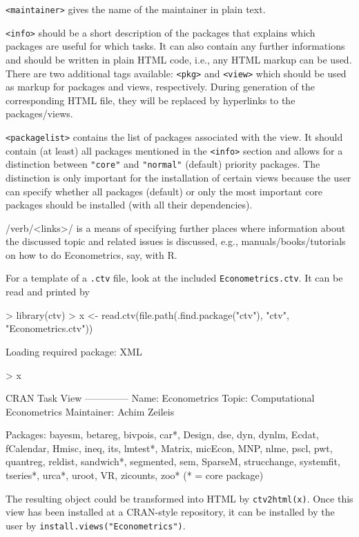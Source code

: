 \documentclass[a4paper]{article}
\begin{document}
\verb/<maintainer>/ gives the name of the maintainer in plain text.

\verb/<info>/ should be a short description of the packages that explains
which packages are useful for which tasks. It can also contain any further
informations and should be written in plain HTML code, i.e., any HTML markup
can be used. There are two additional tags available: \verb/<pkg>/ and 
\verb/<view>/ which should be used as markup for packages and views, respectively.
During generation of the corresponding HTML file, they will be replaced by
hyperlinks to the packages/views.

\verb/<packagelist>/ contains the list of packages associated with the view.
It should contain (at least) all packages mentioned in the \verb/<info>/ section
and allows for a distinction between \verb/"core"/ and \verb/"normal"/ (default)
priority packages. The distinction is only important for the installation of
certain views because the user can specify whether all packages (default) or only
the most important core packages should be installed (with all their dependencies).

/verb/<links>/ is a means of specifying further places where information about
the discussed topic and related issues is discussed, e.g., manuals/books/tutorials
on how to do Econometrics, say, with \textsf{R}.

For a template of a \verb/.ctv/ file, look at the included \verb/Econometrics.ctv/.
It can be read and printed by

\begin{Schunk}
\begin{Sinput}
> library(ctv)
> x <- read.ctv(file.path(.find.package("ctv"), "ctv", "Econometrics.ctv"))
\end{Sinput}
\begin{Soutput}
Loading required package: XML
\end{Soutput}
\begin{Sinput}
> x
\end{Sinput}
\begin{Soutput}
CRAN Task View
--------------
Name:       Econometrics
Topic:      Computational Econometrics
Maintainer: Achim Zeileis

Packages:   bayesm, betareg, bivpois, car*, Design, dse, dyn, dynlm, Ecdat,
            fCalendar, Hmisc, ineq, its, lmtest*, Matrix, micEcon, MNP, nlme,
            pscl, pwt, quantreg, reldist, sandwich*, segmented, sem, SparseM,
            strucchange, systemfit, tseries*, urca*, uroot, VR, zicounts, zoo*
            (* = core package)
\end{Soutput}
\end{Schunk}

The resulting object could be transformed into HTML by \verb/ctv2html(x)/.
Once this view has been installed at a CRAN-style repository, it can be installed by
the user by \verb/install.views("Econometrics")/.
\end{document}
